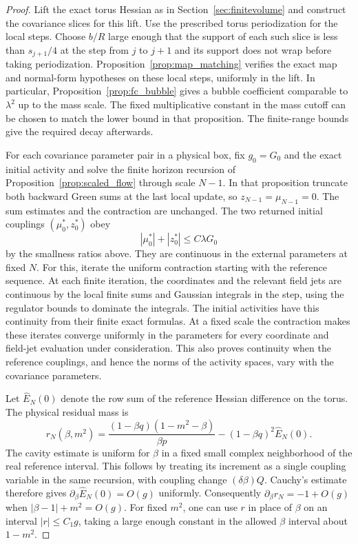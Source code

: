 \documentclass[11pt]{article}
\begin{document}
\begin{proof}
Lift the exact torus Hessian as in Section~\ref{sec:finitevolume}
and construct the covariance slices for this lift. Use the
prescribed torus periodization for the local steps. Choose
\(b/R\) large enough that the support of each such slice is
less than \(s_{j+1}/4\) at the step from \(j\) to \(j+1\) and its support
does not wrap before taking periodization. Proposition~\ref{prop:map_matching} verifies the exact map and
normal-form hypotheses on these local steps, uniformly in the lift. In particular, Proposition~\ref{prop:fc_bubble}
gives a bubble coefficient comparable to \(\lambda^2\) up to the
mass scale. The fixed multiplicative constant in the mass cutoff
can be chosen to match the lower bound in that proposition.
The finite-range bounds give the required decay afterwards.

For each covariance parameter pair in a physical box, fix
\(g_0=G_0\) and the exact initial activity and solve the finite
horizon recursion of Proposition~\ref{prop:scaled_flow} through
scale \(N-1\). In that proposition truncate both backward
Green sums at the last local update, so \(z_{N-1}=\mu_{N-1}=0\).
The sum estimates and the contraction are unchanged. The two
returned initial couplings \((\mu_0^*,z_0^*)\) obey
\[
 |\mu_0^*|+|z_0^*|\le C\lambda G_0
\]
by the smallness ratios above. They are continuous in the
external parameters at fixed \(N\). For this, iterate the
uniform contraction starting with the reference sequence.
At each finite iteration, the coordinates and the relevant
field jets are continuous by the local finite sums and
Gaussian integrals in the step, using the regulator bounds
to dominate the integrals. The initial activities have this
continuity from their finite exact formulas. At a fixed scale
the contraction makes these iterates converge uniformly in the
parameters for every coordinate and field-jet evaluation
under consideration. This also proves continuity when the
reference couplings, and hence the norms of the activity
spaces, vary with the covariance parameters.

Let \(\widehat E_N(0)\) denote the row sum of the reference
Hessian difference on the torus. The physical residual mass is
\[
 r_N(\beta,m^2)
 =\frac{(1-\beta q)(1-m^2-\beta)}{\beta p}
     -(1-\beta q)^2\widehat E_N(0).
\]
The cavity estimate is uniform for \(\beta\) in a fixed small
complex neighborhood of the real reference interval. This
follows by treating its increment as a single coupling
variable in the same recursion, with coupling change
\((\delta\beta)Q\). Cauchy's estimate therefore gives
\(\partial_\beta\widehat E_N(0)=O(g)\) uniformly. Consequently
\(\partial_\beta r_N=-1+O(g)\) when
\(|\beta-1|+m^2=O(g)\). For fixed \(m^2\), one can
use \(r\) in place of \(\beta\) on an interval
\(|r|\le C_1 g\), taking a large enough constant in the allowed
\(\beta\) interval about \(1-m^2\).


\end{proof}
\end{document}
